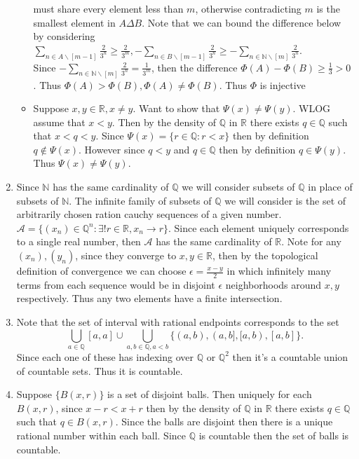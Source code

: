 \documentclass[12pt, letterpaper]{article}
\newcommand{\N}{\mathbb{N}}
\newcommand{\R}{\mathbb{R}}
\newcommand{\Q}{\mathbb{Q}}
\begin{document}
\begin{enumerate}
\begin{itemize}
		must share every element less than $m$, otherwise contradicting $m$ is the smallest element in $A \Delta B$.
		Note that we can bound the difference below by considering $\sum_{n \in A \backslash [m-1]} \frac{2}{3^n} \geq \frac{2}{3^m}, -\sum_{n \in B \backslash [m-1]}\frac{2}{3^n}\geq -\sum_{n \in \N \backslash [m]}\frac{2}{3^n}$.  \\
		Since $-\sum_{n \in \N \backslash [m]}\frac{2}{3^n} = \frac{1}{3^m}$,
		then the difference $\Phi(A) - \Phi(B) \geq \frac{1}{3} > 0$.  Thus 
		$\Phi(A) > \Phi(B), \Phi(A) \neq \Phi(B)$.  Thus $\Phi$ is injective
		\item Suppose $x, y \in \R, x \neq y$.  Want to show that $\Psi(x) \neq \Psi(y)$.  WLOG assume that $x < y$.  Then by the density of $\Q$ in $\R$ 
		there exists $q \in \Q$ such that $x < q < y$.  Since $\Psi(x) = \{r \in \Q : r < x\}$ then by definition $q \not \in \Psi(x)$.  However since $q <y$
		and $q \in \Q$ then by definition $q \in \Psi(y)$.  Thus $\Psi(x) \neq \Psi(y)$.  
	\end{itemize}
	\item Since $\N$ has the same cardinality of $\Q$ we will consider 
	subsets of $\Q$ in place of subsets of $\N$.  The infinite family 
	of subsets of $\Q$ we will consider is the set of arbitrarily chosen 
	ration cauchy sequences of a given number.  
	$\mathcal{A} = \{(x_n) \in \Q^n: \exists ! r \in \R, x_n \to r\}$.  
	Since each element uniquely corresponds to a single real number, then $\mathcal{A}$ has the same cardinality of $\R$.  Note for any $(x_n), (y_n)$,
	since they converge to $x,y \in \R$, then by the topological definition of 
	convergence we can choose $\epsilon = \frac{x-y}{2}$ in which infinitely 
	many terms from each sequence would be in disjoint $\epsilon$ neighborhoods around 
	$x,y$ respectively.  Thus any two elements have a finite intersection.
	\item Note that the set of interval with rational endpoints corresponds to the 
	set 
	$$
	\bigcup_{a \in \Q} [a,a] \cup \bigcup_{a,b \in \Q, a < b} \{(a,b), (a,b],[a,b), [a,b]\}.
	$$
	Since each one of these has indexing over $\Q$ or $\Q^2$ then it's a countable
	union of countable sets.  Thus it is countable.  
	\item Suppose $\{B(x,r)\}$ is a set of disjoint balls.  
	Then uniquely for each $B(x,r)$, since $x-r < x+r$ then by the density of 
	$\Q$ in $\R$ there exists $q \in \Q$ such that $q \in B(x,r)$.  Since 
	the balls are disjoint then there is a unique rational number within each ball.
	Since $\Q$ is countable then the set of balls is countable.  

\end{enumerate}
\end{document}
